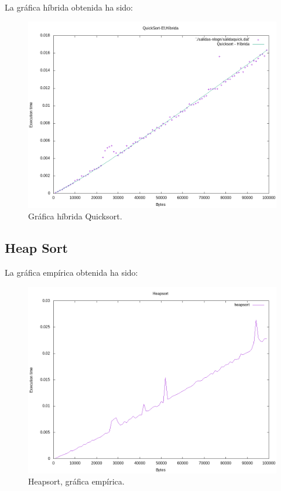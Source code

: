 La gráfica híbrida obtenida ha sido:
\begin{figure}[H]
	\centering
	\includegraphics[scale=0.5]{imagenes/quicksort-hibrida.png}
	\caption{Gráfica híbrida Quicksort.}
	\label{fig:E10}
\end{figure}

\subsection{Heap Sort}
La gráfica empírica obtenida ha sido:
\begin{figure}[H]
	\centering
	\includegraphics[scale=0.5]{imagenes/heapsort.png}
	\caption{Heapsort, gráfica empírica.}
	\label{fig:E11}
\end{figure}


